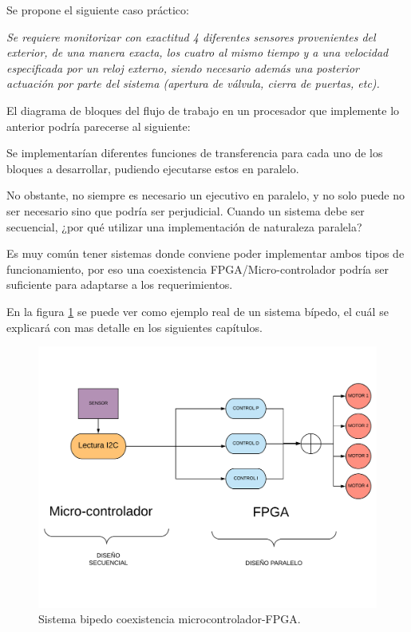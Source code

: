 Se propone el siguiente caso práctico:\newline

\textsl{Se requiere monitorizar con exactitud 4 diferentes sensores provenientes del exterior, de una manera exacta, los cuatro al mismo tiempo y a una velocidad especificada por un reloj externo, siendo necesario además una posterior actuación por parte del sistema (apertura de válvula, cierra de puertas, etc).}\newline

El diagrama de bloques del flujo de trabajo en un procesador que implemente lo anterior podría parecerse al siguiente:




Se implementarían diferentes funciones de transferencia para cada uno de los bloques a desarrollar, pudiendo ejecutarse estos en paralelo. \newline

No obstante, no siempre es necesario un ejecutivo en paralelo, y no solo puede no ser necesario sino que podría ser perjudicial. Cuando un sistema debe ser secuencial, ¿por qué utilizar una implementación de naturaleza paralela? \newline

Es muy común tener sistemas donde conviene poder implementar ambos tipos de funcionamiento, por eso una coexistencia FPGA/Micro-controlador podría ser suficiente para adaptarse a los requerimientos. \newline

En la figura \ref{fig:bipedo} se puede ver como ejemplo real de un sistema bípedo, el cuál se explicará con mas detalle en los siguientes capítulos.

\begin{center}
	\begin{figure}[H]
		\center
		\includegraphics[scale=0.4]{imagenes/EstadoArte/bipedo.pdf}
		\caption{Sistema bipedo coexistencia microcontrolador-FPGA.}
		\label{fig:bipedo}
	\end{figure}
\end{center}
